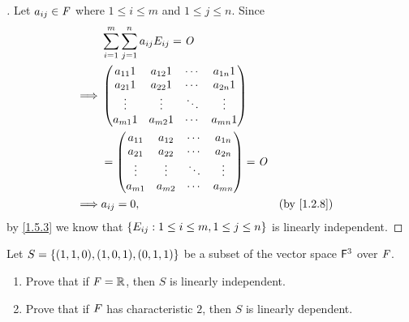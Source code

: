 \begin{proof}[]
  Let \(a_{i j} \in \mathit{F}\) where \(1 \leq i \leq m\) and \(1 \leq j \leq n\).
  Since
  \begin{align*}
             & \sum_{i = 1}^m \sum_{j = 1}^{n} a_{i j} E_{i j} = \zm                               \\
    \implies & \begin{pmatrix}
      a_{1 1} 1 & a_{1 2} 1 & \cdots & a_{1 n} 1 \\
      a_{2 1} 1 & a_{2 2} 1 & \cdots & a_{2 n} 1 \\
      \vdots    & \vdots    & \ddots & \vdots    \\
      a_{m 1} 1 & a_{m 2} 1 & \cdots & a_{m n} 1
    \end{pmatrix}                                                          \\
             & = \begin{pmatrix}
      a_{1 1} & a_{1 2} & \cdots & a_{1 n} \\
      a_{2 1} & a_{2 2} & \cdots & a_{2 n} \\
      \vdots  & \vdots  & \ddots & \vdots  \\
      a_{m 1} & a_{m 2} & \cdots & a_{m n}
    \end{pmatrix} = \zm                                                  \\
    \implies & a_{i j} = 0,                                          &  & \text{(by \cref{1.2.8})}
  \end{align*}
  by \cref{1.5.3} we know that \(\left\lbrace E_{i j} : 1 \leq i \leq m, 1 \leq j \leq n\right\rbrace\) is linearly independent.
\end{proof}

\setcounter{ex}{7}
\begin{ex}\label{ex:1.5.8}
  Let \(S = \left\lbrace(1, 1, 0), (1, 0, 1), (0, 1, 1)\right\rbrace\) be a subset of the vector space \(\mathsf{F}^3\) over \(\mathit{F}\).
  \begin{enumerate}
    \item Prove that if \(\mathit{F} = \mathbb{R}\), then \(S\) is linearly independent.
    \item Prove that if \(\mathit{F}\) has characteristic \(2\), then \(S\) is linearly dependent.
  \end{enumerate}
\end{ex}


